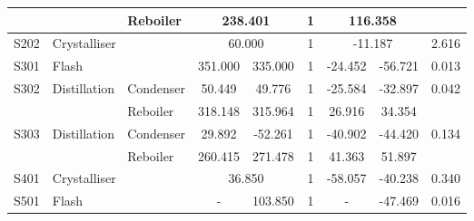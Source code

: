 \begin{table}[h]
{\begin{tabular}{|l|l|l|c|c|c|c|c|c|c|}
                                           &                                      & Reboiler       & \multicolumn{2}{c|}{238.401}          & 1                               & \multicolumn{2}{c|}{116.358}        & \multicolumn{2}{c|}{}                       \\ \hline
S202                                       & \multicolumn{2}{l|}{Crystalliser}                     & \multicolumn{2}{c|}{60.000}           & 1                               & \multicolumn{2}{c|}{-11.187}        & \multicolumn{2}{c|}{2.616}                  \\ \hline
S301                                       & \multicolumn{2}{l|}{Flash}                            & 351.000           & 335.000           & 1                               & -24.452          & -56.721          & \multicolumn{2}{c|}{0.013}                  \\ \hline
\multirow{2}{*}{S302}                      & \multirow{2}{*}{Distillation}        & Condenser      & 50.449            & 49.776            & 1                               & -25.584          & -32.897          & \multicolumn{2}{c|}{\multirow{2}{*}{0.042}} \\ \cline{3-8}
                                           &                                      & Reboiler       & 318.148           & 315.964           & 1                               & 26.916           & 34.354           & \multicolumn{2}{c|}{}                       \\ \hline
\multirow{2}{*}{S303}                      & \multirow{2}{*}{Distillation}        & Condenser      & 29.892            & -52.261           & 1                               & -40.902          & -44.420          & \multicolumn{2}{c|}{\multirow{2}{*}{0.134}} \\ \cline{3-8}
                                           &                                      & Reboiler       & 260.415           & 271.478           & 1                               & 41.363           & 51.897           & \multicolumn{2}{c|}{}                       \\ \hline
S401                                       & \multicolumn{2}{l|}{Crystalliser}                     & \multicolumn{2}{c|}{36.850}           & 1                               & -58.057          & -40.238          & \multicolumn{2}{c|}{0.340}                  \\ \hline
S501                                       & \multicolumn{2}{l|}{Flash}                            & -                 & 103.850           & 1                               & -                & -47.469          & \multicolumn{2}{c|}{0.016}                  \\ \hline

\end{tabular}}
\end{table}
